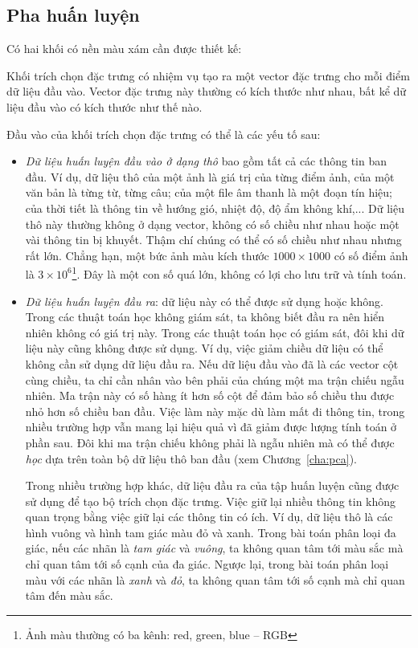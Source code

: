 \subsection{Pha huấn luyện}
Có hai khối có nền màu xám cần được thiết kế:

Khối trích chọn đặc trưng có nhiệm vụ tạo ra một
vector đặc trưng cho mỗi điểm dữ liệu đầu vào. Vector đặc trưng này thường có
kích thước như nhau, bất kể dữ liệu đầu vào có kích thước như thế nào.

Đầu vào của khối trích chọn đặc trưng có thể là các yếu tố sau:

\begin{itemize}
\item \textit{Dữ liệu huấn luyện đầu vào ở dạng thô} bao gồm tất cả các thông tin ban đầu. Ví dụ, dữ liệu thô của một ảnh là
giá trị của từng điểm ảnh, của một văn bản là từng từ, từng câu; của một
file âm thanh là một đoạn tín hiệu; của thời tiết là thông tin về hướng gió,
nhiệt độ, độ ẩm không khí,... Dữ liệu thô này thường không ở dạng vector,
không có số chiều như nhau hoặc một vài thông tin bị khuyết. Thậm chí chúng
có thể có số chiều như nhau nhưng rất lớn. Chẳng hạn, một bức ảnh màu kích
thước $1000\times 1000$ có số điểm ảnh là $3 \times 10^6$\footnote{Ảnh màu
thường có ba kênh: red, green, blue -- RGB}. Đây là một con số quá lớn, không có lợi cho lưu
trữ và tính toán.

\item \textit{Dữ liệu huấn luyện đầu ra}: dữ liệu này có thể được sử dụng
hoặc không. Trong các thuật toán học không giám sát, ta không biết đầu ra
nên hiển nhiên không có giá trị này. Trong các thuật toán học có giám sát,
đôi khi dữ liệu này cũng không được sử dụng. Ví dụ, việc giảm chiều dữ liệu
có thể không cần sử dụng dữ liệu đầu ra. Nếu dữ liệu đầu vào đã là các
vector cột cùng chiều, ta chỉ cần nhân vào bên phải của chúng một ma trận
chiếu ngẫu nhiên. Ma trận này có số hàng ít hơn số cột để đảm bảo số chiều
thu được nhỏ hơn số chiều ban đầu. Việc làm này mặc dù làm mất đi thông tin,
trong nhiều trường hợp vẫn mang lại hiệu quả vì đã giảm được lượng tính toán
ở phần sau. Đôi khi {ma trận chiếu} không phải là ngẫu nhiên mà có thể được
\textit{học} dựa trên toàn bộ dữ liệu thô ban đầu (xem Chương~\ref{cha:pca}).

Trong nhiều trường hợp khác, dữ liệu đầu ra của tập huấn luyện cũng được sử
dụng để tạo bộ trích chọn đặc trưng. Việc giữ lại
nhiều thông tin không quan trọng bằng việc giữ lại các thông tin có ích. Ví dụ, dữ liệu thô là các hình vuông và hình tam giác màu đỏ và xanh.
Trong bài toán phân loại đa giác, nếu các nhãn là \textit{tam giác} và
\textit{vuông}, ta không quan tâm tới màu sắc mà chỉ quan tâm tới số cạnh
của đa giác. Ngược lại, trong bài toán phân loại màu với các nhãn là
\textit{xanh} và \textit{đỏ}, ta không quan tâm tới số cạnh mà chỉ quan tâm
đến màu sắc.


\end{itemize}

